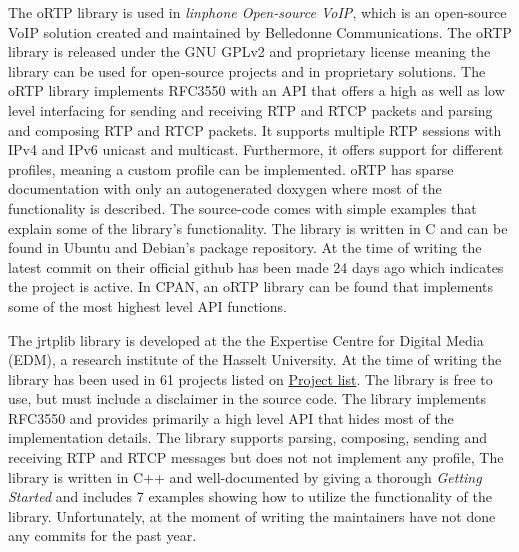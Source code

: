 \noindent{} 
The oRTP library is used in \textit{linphone Open-source VoIP}, which is an open-source VoIP solution created and maintained by Belledonne Communications. The oRTP library is released under the GNU GPLv2 and proprietary license meaning the library can be used for open-source projects and in proprietary solutions.
The oRTP library implements RFC3550 with an API that offers a high as well as low level interfacing for sending and receiving RTP and RTCP packets and parsing and composing RTP and RTCP packets. It supports multiple RTP sessions with IPv4 and IPv6 unicast and multicast. Furthermore, it offers support for different profiles, meaning a custom profile can be implemented.  oRTP has sparse documentation with only an autogenerated doxygen where most of the functionality is described. The source-code comes with simple examples that explain some of the library's functionality. The library is written in C and can be found in Ubuntu and Debian's package repository. At the time of writing the latest commit on their official github has been made 24 days ago which indicates the project is active. In CPAN, an oRTP library can be found that implements some of the most highest level API functions.


The jrtplib library is developed at the the Expertise Centre for Digital Media (EDM), a research institute of the Hasselt University. At the time of writing the library has been used in 61 projects listed on \href{http://research.edm.uhasselt.be/jori/cgi-bin/listprojects.py?name=jrtplib}{Project list}. The library is free to use, but must include a disclaimer in the source code. The library implements RFC3550 and provides primarily a high level API that hides most of the implementation details. The library supports parsing, composing, sending and receiving RTP and RTCP messages but does not not implement any profile, The library is written in C++ and well-documented by giving a thorough \textit{Getting Started} and includes 7 examples showing how to utilize the functionality of the library. Unfortunately, at the moment of writing the maintainers have not done any commits for the past year.

